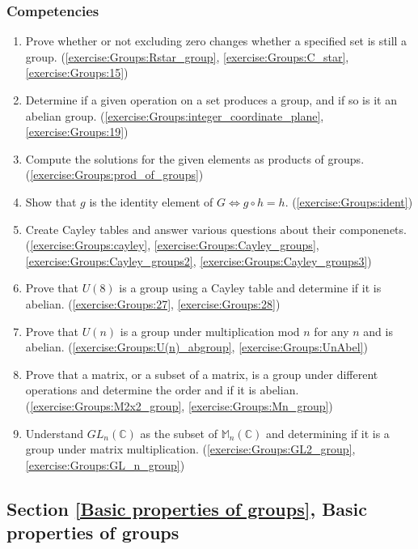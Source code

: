 \subsubsection*{Competencies}
\begin{enumerate}
\item
Prove whether or not excluding zero changes whether a specified set is still a group. (\ref{exercise:Groups:Rstar_group}, \ref{exercise:Groups:C_star}, \ref{exercise:Groups:15})
\item
Determine if a given operation on a set produces a group, and if so is it an abelian group. (\ref{exercise:Groups:integer_coordinate_plane}, \ref{exercise:Groups:19})
\item
Compute the solutions for the given elements as products of groups. (\ref{exercise:Groups:prod_of_groups})
\item
Show that $g$ is the identity element of $G \iff g \circ h = h$. (\ref{exercise:Groups:ident})
\item
Create Cayley tables and answer various questions about their componenets. (\ref{exercise:Groups:cayley}, \ref{exercise:Groups:Cayley_groups}, \ref{exercise:Groups:Cayley_groups2}, \ref{exercise:Groups:Cayley_groups3})
\item
Prove that $U(8)$ is a group using a Cayley table and determine if it is abelian. (\ref{exercise:Groups:27}, \ref{exercise:Groups:28})
\item
Prove that $U(n)$ is a group under multiplication mod $n$ for any $n$ and is abelian. (\ref{exercise:Groups:U(n)_abgroup}, \ref{exercise:Groups:UnAbel})
\item
Prove that a matrix, or a subset of a matrix,  is a group under different operations and determine the order and if it is abelian. (\ref{exercise:Groups:M2x2_group}, \ref{exercise:Groups:Mn_group})
\item
Understand $GL_n({\mathbb C})$ as the subset of ${\mathbb M}_n({\mathbb C})$ and determining if it is a group under matrix multiplication. (\ref{exercise:Groups:GL2_group}, \ref{exercise:Groups:GL_n_group})
\end{enumerate}


\subsection*{Section \ref{Basic properties of groups}, Basic properties of groups}
